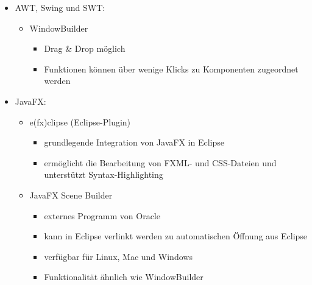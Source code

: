 \begin{itemize}
	\item AWT, Swing und SWT:
	\begin{itemize}
		\item WindowBuilder
		\begin{itemize}
			\item Drag \& Drop möglich
			\item Funktionen können über wenige Klicks zu Komponenten zugeordnet werden
		\end{itemize}
	\end{itemize}
	\item JavaFX:
	\begin{itemize}
		\item e(fx)clipse (Eclipse-Plugin)
		\begin{itemize}
			\item grundlegende Integration von JavaFX in Eclipse
			\item ermöglicht die Bearbeitung von FXML- und CSS-Dateien und unterstützt Syntax-Highlighting
		\end{itemize}
		\item JavaFX Scene Builder
		\begin{itemize}
			\item externes Programm von Oracle
			\item kann in Eclipse verlinkt werden zu automatischen Öffnung aus Eclipse
			\item verfügbar für Linux, Mac und Windows 
			\item Funktionalität ähnlich wie WindowBuilder
		\end{itemize}
	\end{itemize}
\end{itemize}
\nsecend
\nsecend